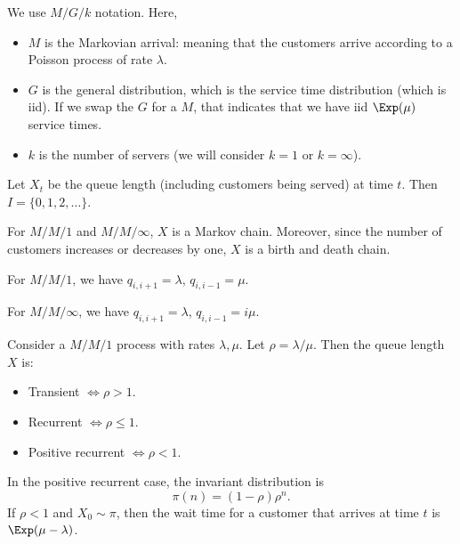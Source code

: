 \documentclass[12pt]{article}
\begin{document}
We use $M/G/k$ notation. Here,
\begin{itemize}
	\item $M$ is the Markovian arrival: meaning that the customers arrive according to a Poisson process of rate $\lambda$.
	\item $G$ is the general distribution, which is the service time distribution (which is iid). If we swap the $G$ for a $M$, that indicates that we have iid $\Exp(\mu)$ service times.
	\item $k$ is the number of servers (we will consider $k = 1$ or $k = \infty$).
\end{itemize}

Let $X_t$ be the queue length (including customers being served) at time $t$. Then $I = \{0, 1, 2, \ldots\}$.

For $M/M/1$ and $M/M/\infty$, $X$ is a Markov chain. Moreover, since the number of customers increases or decreases by one, $X$ is a birth and death chain.

For $M/M/1$, we have $q_{i,i+1} = \lambda$, $q_{i,i-1} = \mu$.

For $M/M/\infty$, we have $q_{i,i+1} = \lambda$, $q_{i,i-1} = i \mu$.

\begin{theorem}
	Consider a $M/M/1$ process with rates $\lambda, \mu$. Let $\rho = \lambda/\mu$. Then the queue length $X$ is:
	\begin{itemize}
		\item Transient $\iff \rho > 1$.
		\item Recurrent $\iff \rho \leq 1$.
		\item Positive recurrent $\iff \rho < 1$.
	\end{itemize}
	In the positive recurrent case, the invariant distribution is
	\[
	\pi(n) = (1 - \rho)\rho^{n}
	.\]
	If $\rho < 1$ and $X_0 \sim \pi$, then the wait time for a customer that arrives at time $t$ is $\Exp(\mu - \lambda)$.
\end{theorem}
\end{document}
